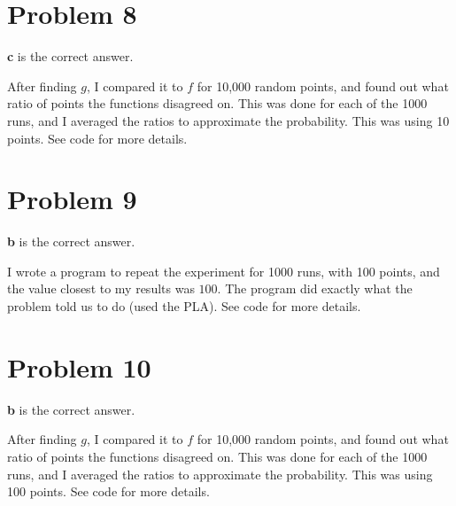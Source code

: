 \documentclass{article}
\begin{document}
\section*{Problem 8}
\textbf{c} is the correct answer.

\noindent After finding $g$, I compared it to $f$ for 10,000 random points,
and found out what ratio of points the functions disagreed on. This
was done for each of the 1000 runs, and I averaged the ratios to approximate
the probability. This was using 10 points. See code for more details.
\section*{Problem 9}
\textbf{b} is the correct answer.

\noindent I wrote a program to repeat the experiment for 1000 runs, with 100
points, and the value closest to my results was $100$. The program did exactly
what the problem told us to do (used the PLA).
See code for more details.
\section*{Problem 10}
\textbf{b} is the correct answer.

\noindent After finding $g$, I compared it to $f$ for 10,000 random points,
and found out what ratio of points the functions disagreed on. This
was done for each of the 1000 runs, and I averaged the ratios to approximate
the probability. This was using 100 points. See code for more details.
\newpage
\end{document}

